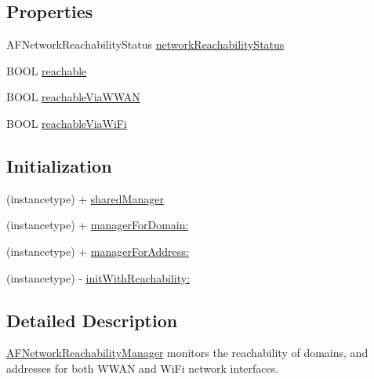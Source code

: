 \subsection*{Properties}
\begin{DoxyCompactItemize}
\item 
A\+F\+Network\+Reachability\+Status \hyperlink{interface_a_f_network_reachability_manager_a4de1790d27df4c6a3586d3961d9c7b77}{network\+Reachability\+Status}
\item 
B\+O\+O\+L \hyperlink{interface_a_f_network_reachability_manager_a9c2f8249d282f08b770172b86d021983}{reachable}
\item 
B\+O\+O\+L \hyperlink{interface_a_f_network_reachability_manager_a3bf818f1daba31c4b15949679d348025}{reachable\+Via\+W\+W\+A\+N}
\item 
B\+O\+O\+L \hyperlink{interface_a_f_network_reachability_manager_a8ada1e526c4f63340a2f893fe4b4e947}{reachable\+Via\+Wi\+Fi}
\end{DoxyCompactItemize}
\subsection*{Initialization}
\label{_amgrp61bcd96a2c1f8026527cbf2019d6e9a4}%


 

 \begin{DoxyCompactItemize}
\item 
(instancetype) + \hyperlink{interface_a_f_network_reachability_manager_abc98fb713ecc5de942904768512ea1d0}{shared\+Manager}
\item 
(instancetype) + \hyperlink{interface_a_f_network_reachability_manager_a6bb357339197c29a2305519e7e4622f3}{manager\+For\+Domain\+:}
\item 
(instancetype) + \hyperlink{interface_a_f_network_reachability_manager_abcf59bed68830fd7440310b3772022f4}{manager\+For\+Address\+:}
\item 
(instancetype) -\/ \hyperlink{interface_a_f_network_reachability_manager_a14b6db66e80c81c86cb698e98f991392}{init\+With\+Reachability\+:}
\end{DoxyCompactItemize}


\subsection{Detailed Description}
{\ttfamily \hyperlink{interface_a_f_network_reachability_manager}{A\+F\+Network\+Reachability\+Manager}} monitors the reachability of domains, and addresses for both W\+W\+A\+N and Wi\+Fi network interfaces.

